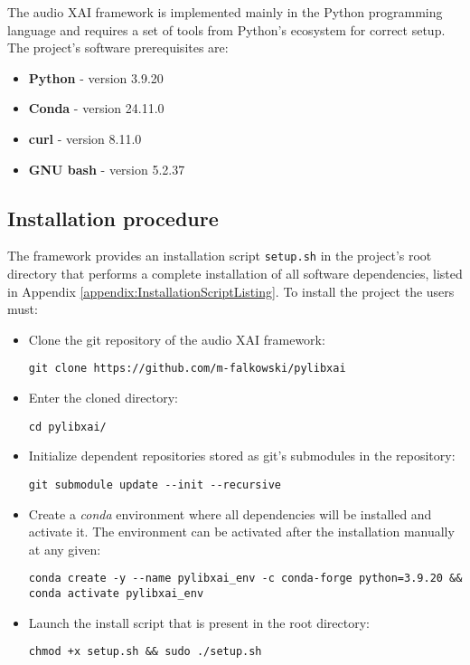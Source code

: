 \documentclass[
    bindingoffset=5mm,  %
    footnoteindent=3mm, %
    hyphenation=true    %
]{src/wut-thesis}
\begin{document}
The audio XAI framework is implemented mainly in the Python programming language and
requires a set of tools from Python's ecosystem for correct setup.
The project's software prerequisites are:

\begin{itemize}
    \item \textbf{Python} - version 3.9.20
    \item \textbf{Conda} - version 24.11.0
    \item \textbf{curl} - version 8.11.0
    \item \textbf{GNU bash} -  version 5.2.37
\end{itemize}

\subsection{Installation procedure}

The framework provides an installation script \texttt{setup.sh} in the project’s root directory that performs
a complete installation of all software dependencies,
listed in Appendix \ref{appendix:InstallationScriptListing}.
To install the project the users must:

\begin{itemize}
    \item Clone the git repository of the audio XAI framework:
\begin{verbatim}
git clone https://github.com/m-falkowski/pylibxai
\end{verbatim}
    \item Enter the cloned directory:
\begin{verbatim}
cd pylibxai/
\end{verbatim}
    \item Initialize dependent repositories stored as git's submodules in the repository:
\begin{verbatim}
git submodule update --init --recursive
\end{verbatim}
    \item Create a \emph{conda} environment where all dependencies will be installed and activate it.
    The environment can be activated after the installation manually at any given:
\begin{verbatim}
conda create -y --name pylibxai_env -c conda-forge python=3.9.20 && conda activate pylibxai_env
\end{verbatim}
    \item Launch the install script that is present in the root directory:
\begin{verbatim}
chmod +x setup.sh && sudo ./setup.sh
\end{verbatim}
\end{itemize}
\end{document}
